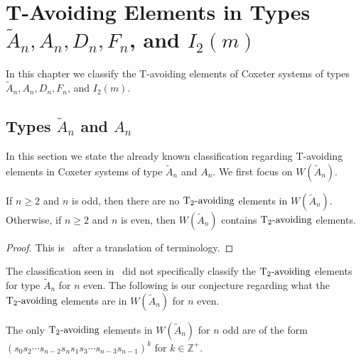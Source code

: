 \chapter{T-Avoiding Elements in Types $\widetilde{A}_n, A_n, D_n, F_n$, and $I_2(m)$}\label{chap:TandTavoid}

In this chapter we classify the T-avoiding elements of Coxeter systems of types $\widetilde{A}_n, A_n, D_n, F_n$, and $I_2(m)$.


\section{Types $\widetilde{A}_n$ and $A_n$}\label{sec:tavoidA}
In this section we state the already known classification regarding T-avoiding elements in Coxeter systems of type $\widetilde{A}_n$ and $A_n$. We first focus on $W(\widetilde{A}_n)$.

\begin{proposition}
 If $n \geq 2$ and $n$ is odd, then there are no $\operatorname{T_2-\mathrm{avoiding}}$ elements in $W(\widetilde{A}_n)$. Otherwise, if $n \geq 2$ and $n$ is even, then $W(\widetilde{A}_n)$ contains $\operatorname{T_2-\mathrm{avoiding}}$ elements.
\begin{proof}
	This is~\cite[Proposition~3.1.2]{Fan1999} after a translation of terminology.\qedhere
\end{proof}
\end{proposition}



The classification seen in~\cite{Fan1999} did not specifically classify the $\operatorname{T_2-\mathrm{avoiding}}$ elements for type $\widetilde{A}_n$ for $n$ even. The following is our conjecture regarding what the $\operatorname{T_2-\mathrm{avoiding}}$ elements are in $W(\widetilde{A}_n)$ for $n$ even.
\begin{conjecture}
	The only $\operatorname{T_2-\mathrm{avoiding}}$ elements in $W(\widetilde{A}_n)$ for $n$ odd are of the form $(s_0s_2 \cdots s_{n-2}s_ns_1s_3 \cdots s_{n-3}s_{n-1})^k$  for $k \in \mathbb{Z}^+$. 
\end{conjecture} 

